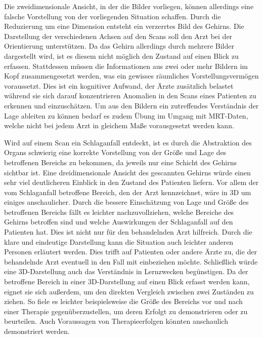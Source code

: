 Die zweidimensionale Ansicht, in der die Bilder vorliegen, können allerdings eine falsche Vorstellung von der vorliegenden Situation schaffen. 
Durch die Reduzierung um eine Dimension entsteht ein verzerrtes Bild des Gehirns. Die Darstellung der verschiedenen Achsen auf den Scans soll den Arzt bei der Orientierung unterstützen. Da das Gehirn allerdings durch mehrere Bilder dargestellt wird, ist es diesem nicht möglich den Zustand auf einen Blick zu erfassen. Stattdessen müssen die Informationen aus zwei oder mehr Bildern im Kopf zusammengesetzt werden, was ein gewisses räumliches Vorstellungsvermögen voraussetzt. Dies ist ein kognitiver Aufwand, der Ärzte zusätzlich belastet während sie sich darauf konzentrieren Anomalien in den Scans eines Patienten zu erkennen und einzuschätzen. Um aus den Bildern ein zutreffendes Verständnis der Lage ableiten zu können bedarf es zudem Übung im Umgang mit MRT-Daten, welche nicht bei jedem Arzt in gleichem Maße vorausgesetzt werden kann.

Wird auf einem Scan ein Schlaganfall entdeckt, ist es durch die Abstraktion des Organs schwierig eine korrekte Vorstellung von der Größe und Lage des betroffenen Bereichs zu bekommen, da jeweils nur eine Schicht des Gehirns sichtbar ist. 
Eine dreidimensionale Ansicht des gescannten Gehirns würde einen sehr viel deutlicheren Einblick in den Zustand des Patienten liefern. Vor allem der vom Schlaganfall betroffene Bereich, den der Arzt kennzeichnet, wäre in 3D um einiges anschaulicher. Durch die bessere Einschätzung von Lage und Größe des betroffenen Bereichs fällt es leichter nachzuvollziehen, welche Bereiche des Gehirns betroffen sind und welche Auswirkungen der Schlaganfall auf den Patienten hat. Dies ist nicht nur für den behandelnden Arzt hilfreich. Durch die klare und eindeutige Darstellung kann die Situation auch leichter anderen Personen erläutert werden. Dies trifft auf Patienten oder andere Ärzte zu, die der behandelnde Arzt eventuell in den Fall mit einbeziehen möchte.
Schließlich würde eine 3D-Darstellung auch das Verständnis in Lernzwecken begünstigen. 
Da der betroffene Bereich in einer 3D-Darstellung auf einen Blick erfasst werden kann, eignet sie sich außerdem, um den direkten Vergleich zwischen zwei Zuständen zu ziehen. So fiele es leichter beispielsweise die Größe des Bereichs vor und nach einer Therapie gegenüberzustellen, um deren Erfolgt zu demonstrieren oder zu beurteilen.
Auch Voraussagen von Therapieerfolgen könnten anschaulich demonstriert werden.

